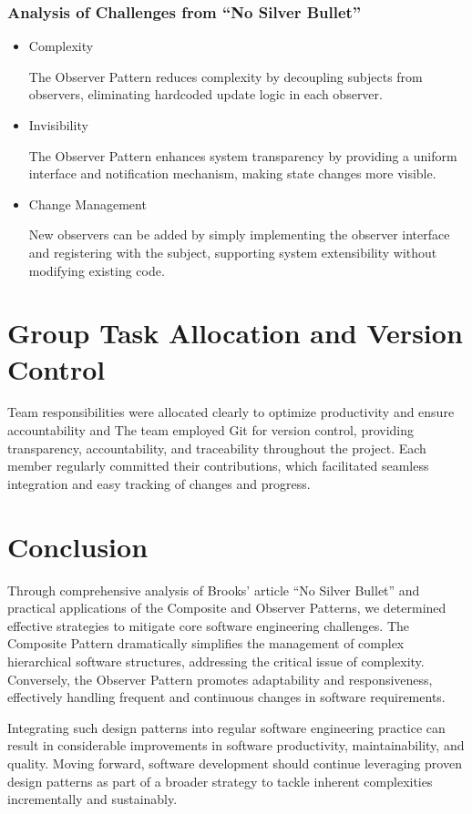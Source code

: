 \documentclass[11pt]{article}
\begin{document}
\subsubsection{Analysis of Challenges from ``No Silver Bullet''}
\begin{itemize}
\item Complexity 

   The Observer Pattern reduces complexity by decoupling subjects from observers, eliminating hardcoded update logic in each observer.

\item Invisibility  

   The Observer Pattern enhances system transparency by providing a uniform interface and notification mechanism, making state changes more visible.

\item Change Management

   New observers can be added by simply implementing the observer interface and registering with the subject, supporting system extensibility without modifying existing code.
\end{itemize}
   

\section{Group Task Allocation and Version Control}
Team responsibilities were allocated clearly to optimize productivity and ensure accountability and The team employed Git for version control, providing transparency, accountability, and traceability throughout the project. Each member regularly committed their contributions, which facilitated seamless integration and easy tracking of changes and progress.

\section{Conclusion}
Through comprehensive analysis of Brooks' article ``No Silver Bullet'' and practical applications of the Composite and Observer Patterns, we determined effective strategies to mitigate core software engineering challenges. The Composite Pattern dramatically simplifies the management of complex hierarchical software structures, addressing the critical issue of complexity. Conversely, the Observer Pattern promotes adaptability and responsiveness, effectively handling frequent and continuous changes in software requirements.

Integrating such design patterns into regular software engineering practice can result in considerable improvements in software productivity, maintainability, and quality. Moving forward, software development should continue leveraging proven design patterns as part of a broader strategy to tackle inherent complexities incrementally and sustainably.
\end{document}

